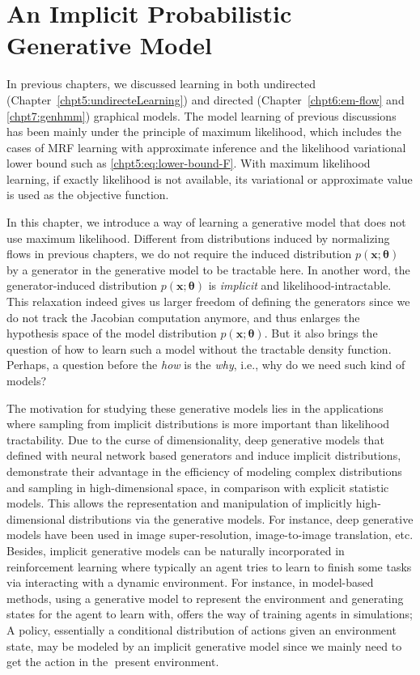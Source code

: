 \chapter{An Implicit Probabilistic Generative Model}
\label{chapter8}
\graphicspath{{source/chapter8/}}
In previous chapters, we discussed learning in both undirected (Chapter~\ref{chpt5:undirecteLearning}) and directed (Chapter~\ref{chpt6:em-flow} and \ref{chpt7:genhmm}) graphical models. The model learning of previous discussions has been mainly under the principle of maximum likelihood, which includes the cases of MRF learning with approximate inference and the likelihood variational lower bound such as \eqref{chpt5:eq:lower-bound-F}. With maximum likelihood learning, if exactly likelihood is not available, its variational or approximate value is used as the objective function.

In this chapter, we introduce a way of learning a generative model that does not use maximum likelihood. Different from distributions induced by normalizing flows in previous chapters, we do not require the induced distribution $p(\bm{x};\bm{\theta})$ by a generator in the generative model to be tractable here. In another word, the generator-induced distribution $p(\bm{x};\bm{\theta})$ is \textit{implicit} and likelihood-intractable. This relaxation indeed gives us larger freedom of defining the generators since we do not track the Jacobian computation anymore, and thus enlarges the hypothesis space of the model distribution $p(\bm{x};\bm{\theta})$. But it also brings the question of how to learn such a model without the tractable density function. Perhaps, a question before the \textit{how} is the \textit{why}, i.e., why do we need such kind of models?

The motivation for studying these generative models lies in the applications where sampling from implicit distributions is more important than likelihood tractability. Due to the curse of dimensionality, deep generative models that defined with neural network based generators and induce implicit distributions, demonstrate their advantage in the efficiency of modeling complex distributions and sampling in high-dimensional space, in comparison with explicit statistic models. This allows the representation and manipulation of implicitly high-dimensional distributions via the generative models. For instance, deep generative models have been used in image super-resolution, image-to-image translation, etc. Besides, implicit generative models can be naturally incorporated in reinforcement learning where typically an agent tries to learn to finish some tasks via interacting with a dynamic environment. For instance, in model-based methods, using a generative model to represent the environment and generating states for the agent to learn with, offers the way of training agents in simulations; A policy, essentially a conditional distribution of actions given an environment state, may be modeled by an implicit generative model since we mainly need to get the action in the present environment.

